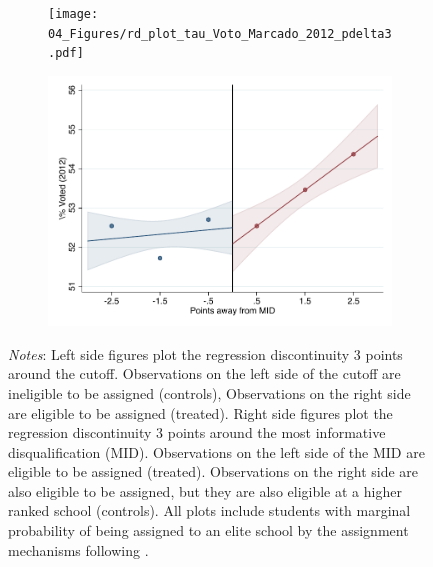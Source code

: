 \documentclass[oneside,11pt]{article}
\begin{document}
\begin{figure}[H]
\begin{center}
    \begin{subfigure}{0.475\textwidth}
        \centering
        \texttt{[image: 04\_Figures/rd\_plot\_tau\_Voto\_Marcado\_2012\_pdelta3.pdf]}
    \end{subfigure}
    \begin{subfigure}{0.475\textwidth}
        \centering
        \includegraphics[width=\textwidth]{04_Figures/rd_plot_mid_Voto_Marcado_2012_pdelta3.pdf}
    \end{subfigure}
    \end{center}
    
\footnotesize
\textit{Notes}: Left side figures plot the regression discontinuity 3 points around the cutoff. Observations on the left side of the cutoff are ineligible to be assigned (controls), Observations on the right side are eligible to be assigned (treated). Right side figures plot the regression discontinuity 3 points around the most informative disqualification (MID). Observations on the left side of the MID are eligible to be assigned (treated). Observations on the right side are also eligible to be assigned, but they are also eligible at a higher ranked school (controls). All plots include students with marginal probability of being assigned to an elite school by the assignment mechanisms following \citet{abdulkadirouglu2022breaking}. 
\end{figure}
\end{document}
